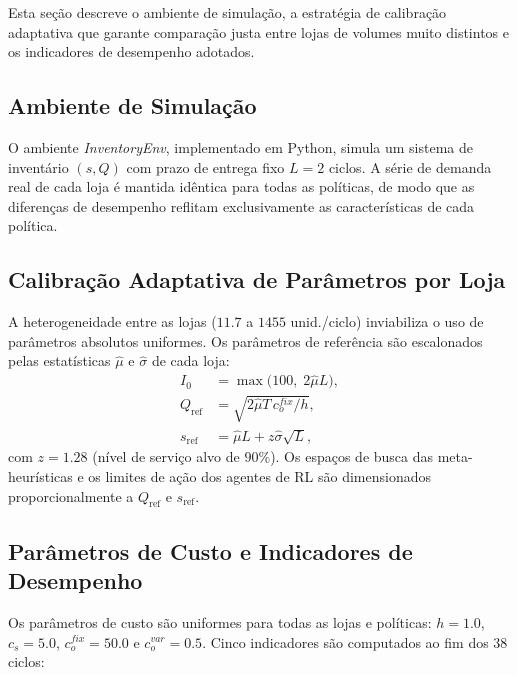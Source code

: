 \documentclass[a4paper,11pt]{article}
\begin{document}
Esta seção descreve o ambiente de simulação, a estratégia de
calibração adaptativa que garante comparação justa entre lojas de
volumes muito distintos e os indicadores de desempenho adotados.

\subsection{Ambiente de Simulação}

O ambiente \textit{InventoryEnv}, implementado em Python, simula um
sistema de inventário $(s, Q)$ com prazo de entrega fixo $L = 2$
ciclos. A série de demanda real de cada loja é mantida idêntica para
todas as políticas, de modo que as diferenças de desempenho
reflitam exclusivamente as características de cada política.

\subsection{Calibração Adaptativa de Parâmetros por Loja}

A heterogeneidade entre as lojas ($11.7$ a $1455$ unid./ciclo)
inviabiliza o uso de parâmetros absolutos uniformes. Os parâmetros
de referência são escalonados pelas estatísticas $\hat{\mu}$ e
$\hat{\sigma}$ de cada loja:
\begin{align}
  I_0 &= \max\!\bigl(100,\; 2\hat{\mu} L\bigr), \label{eq:I0}\\
  Q_\text{ref} &= \sqrt{2\hat{\mu} T\, c_o^{fix} / h}, \label{eq:qref}\\
  s_\text{ref} &= \hat{\mu} L + z\hat{\sigma}\sqrt{L}, \label{eq:sref}
\end{align}
com $z = 1.28$ (nível de serviço alvo de $90\%$). Os espaços de
busca das meta-heurísticas e os limites de ação dos agentes de RL
são dimensionados proporcionalmente a $Q_\text{ref}$ e $s_\text{ref}$.

\subsection{Parâmetros de Custo e Indicadores de Desempenho}

Os parâmetros de custo são uniformes para todas as lojas e políticas:
$h = 1.0$, $c_s = 5.0$, $c_o^{fix} = 50.0$ e
$c_o^{var} = 0.5$. Cinco indicadores são computados ao fim dos
38 ciclos:
\end{document}
